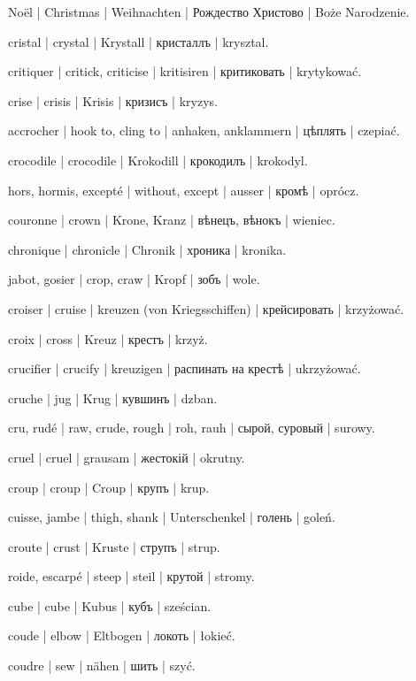 \begin{outdent}{1em}
\uvsubentry{}
Noël | Christmas | Weihnachten | Рождество Христово | Boże Narodzenie.

cristal | crystal | Krystall | кристаллъ | krysztal.

critiquer | critick, criticise | kritisiren | критиковать | krytykować.

crise | crisis | Krisis | кризисъ | kryzys.

accrocher | hook to, cling to | anhaken, anklammern | цѣплять | czepiać.

crocodile | crocodile | Krokodill | крокодилъ | krokodyl.

hors, hormis, excepté | without, except | ausser | кромѣ | oprócz.

couronne | crown | Krone, Kranz | вѣнецъ, вѣнокъ | wieniec.

chronique | chronicle | Chronik | хроника | kronika.

jabot, gosier | crop, craw | Kropf | зобъ | wole.

croiser | cruise | kreuzen (von Kriegsschiffen) | крейсировать | krzyżować.

croix | cross | Kreuz | крестъ | krzyż.

\uvsubentry{}
crucifier | crucify | kreuzigen | распинать на крестѣ | ukrzyżować.

cruche | jug | Krug | кувшинъ | dzban.

cru, rudé | raw, crude, rough | roh, rauh | сырой, суровый | surowy.

cruel | cruel | grausam | жестокій | okrutny.

croup | croup | Croup | крупъ | krup.

cuisse, jambe | thigh, shank | Unterschenkel | голень | goleń.

croute | crust | Kruste | струпъ | strup.

roide, escarpé | steep | steil | крутой | stromy.

cube | cube | Kubus | кубъ | sześcian.

coude | elbow | Eltbogen | локоть | łokieć.

coudre | sew | nähen | шить | szyć.


\end{outdent}
